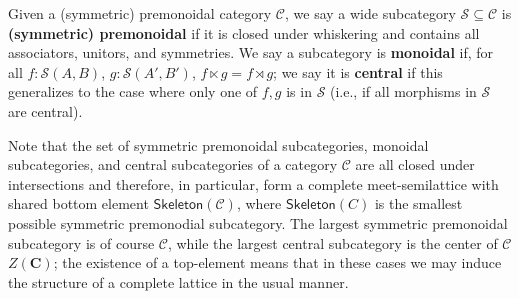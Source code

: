 \documentclass[acmsmall,screen,review]{acmart}
\newcounter{todos}
\newcommand{\TODO}[1]{{
  \stepcounter{todos}
  \begin{center}\large{\textcolor{red}{\textbf{TODO \arabic{todos}:} #1}}\end{center}
}}
\newcommand{\mc}[1]{\ensuremath{\mathcal{#1}}}
\newcommand{\mb}[1]{\ensuremath{\mathbf{#1}}}
\newcommand{\ms}[1]{\ensuremath{\mathsf{#1}}}
\begin{document}
\begin{definition}
  Given a (symmetric) premonoidal category \(\mc{C}\), we say a wide subcategory \(\mc{S} \subseteq \mc{C}\) is \textbf{(symmetric) premonoidal} if it is closed under whiskering and contains all associators, unitors, and symmetries. We say a subcategory is \textbf{monoidal} if, for all \(f: \mc{S}(A, B)\), \(g: \mc{S}(A', B')\), \(f \ltimes g = f \rtimes g\); we say it is \textbf{central} if this generalizes to the case where only one of \(f, g\) is in \(\mc{S}\) (i.e., if all morphisms in \(\mc{S}\) are central).
\end{definition} 
Note that the set of symmetric premonoidal subcategories, monoidal subcategories, and central subcategories of a category \(\mc{C}\) are all closed under intersections and therefore, in particular, form a complete meet-semilattice with shared bottom element \(\ms{Skeleton}(\mc{C})\), where \(\ms{Skeleton}(C)\) is the smallest possible symmetric premonodial subcategory. The largest symmetric premonoidal subcategory is of course \(\mc{C}\), while the largest central subcategory is the center of \(\mc{C}\) \(Z(\mb{C})\); the existence of a top-element means that in these cases we may induce the structure of a complete lattice in the usual manner.


\end{document}
